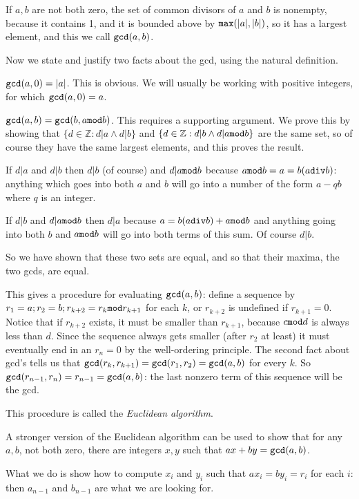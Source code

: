 \documentclass[12pt]{article}
\begin{document}
If $a,b$ are not both zero, the set of common divisors of $a$ and $b$ is nonempty, because it contains 1, and it
is bounded above by ${\tt max}(|a|,|b|)$, so it has a largest element, and this we call ${\tt gcd}(a,b)$.

Now we state and justify two facts about the gcd, using the natural definition.

${\tt gcd}(a,0)= |a|$.  This is obvious.  We will usually be working with positive integers, for which
${\tt gcd}(a,0) = a$.

${\tt gcd}(a,b) = {\tt gcd}(b,a{\tt mod}b)$.  This requires a supporting argument.  We prove this by showing
that $\{d \in {\mathbb Z}:d|a \wedge d|b\}$ and $\{d \in {\mathbb Z}:d|b \wedge d|a{\tt mod}b\}$ are the same set, so of course they have the same largest elements, and this proves the result.

If $d|a$ and $d|b$ then $d|b$ (of course) and $d|a {\tt mod}b$ because $a{\tt mod}b = a = b(a{\tt div} b)$:  anything which goes into both $a$ and $b$ will go into a number of the form $a-qb$ where $q$ is an integer.

If $d|b$ and $d|a{\tt mod}b$ then $d|a$ because $a = b(a{\tt div} b)+a{\tt mod}b$ and anything going into both $b$ and $a{\tt mod}b$ will go into both terms of this sum.  Of course $d|b$.

So we have shown that these two sets are equal, and so that their maxima, the two gcds, are equal.

This gives a procedure for evaluating ${\tt gcd}(a,b)$:  define a sequence by $r_1 = a; r_2 = b; r_{k+2}= r_k{\tt mod}r_{k+1}$ for each $k$, or $r_{k+2}$ is undefined if $r_{k+1}=0$.  Notice that if $r_{k+2}$ exists, it must be smaller than $r_{k+1}$, because $c{\tt mod}d$ is always less than $d$.  Since the sequence always gets smaller (after $r_2$ at least) it must eventually end in an $r_n=0$ by the well-ordering principle.  The second fact about gcd's tells us that
${\tt gcd}(r_k,r_{k+1}) = {\tt gcd}(r_1,r_2) = {\tt gcd}(a,b)$ for every $k$.  So ${\tt gcd}(r_{n-1},r_n) = r_{n-1} = {\tt gcd}(a,b)$:  the last nonzero term of this sequence will be the gcd.

This procedure is called the {\em Euclidean algorithm\/}.

A stronger version of the Euclidean algorithm can be used to show that for any $a,b$, not both zero,
there are integers $x,y$ such that $ax+by = {\tt gcd}(a,b)$.

What we do is show how to compute $x_i$ and $y_i$ such that $ax_i = by_i = r_i$ for each $i$:  then
$a_{n-1}$ and $b_{n-1}$ are what we are looking for.
\end{document}
